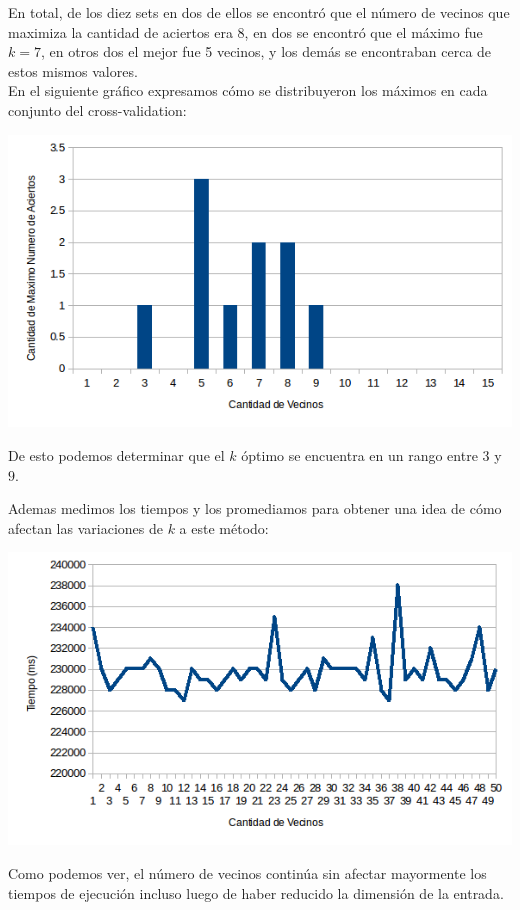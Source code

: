 En total, de los diez sets en dos de ellos se encontró que el número de vecinos que maximiza la cantidad de aciertos era 8, en dos se encontró que el máximo fue $k = 7$, en otros dos el mejor fue 5 vecinos, y los demás se encontraban cerca de estos mismos valores.
\\
En el siguiente gráfico expresamos cómo se distribuyeron los máximos en cada conjunto del cross-validation:
\begin{center}
\includegraphics[scale=0.6]{nuevosResultados/pca/k/mejores.png}\\
\end{center}
De esto podemos determinar que el $k$ óptimo se encuentra en un rango entre $3$ y $9$.

Ademas medimos los tiempos y los promediamos para obtener una idea de cómo afectan las variaciones de $k$ a este método:
\begin{center}
\includegraphics[scale=0.6]{nuevosResultados/pca/k/temp.png}\\
\end{center}

Como podemos ver, el número de vecinos continúa sin afectar mayormente los tiempos de ejecución incluso luego de haber reducido la dimensión de la entrada.




